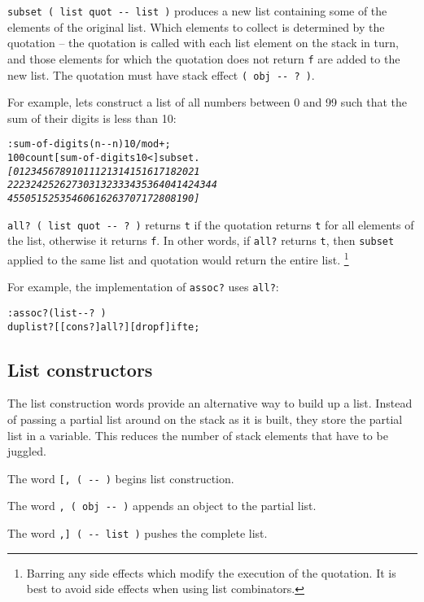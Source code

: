 \documentclass[english]{article}
\begin{document}
\texttt{subset ( list quot -{}- list )} produces a new list containing
some of the elements of the original list. Which elements to collect
is determined by the quotation -- the quotation is called with each
list element on the stack in turn, and those elements for which the
quotation does not return \texttt{f} are added to the new list. The
quotation must have stack effect \texttt{( obj -{}- ?~)}.

For example, lets construct a list of all numbers between 0 and 99
such that the sum of their digits is less than 10:

\begin{alltt}
: sum-of-digits ( n -{}- n ) 10 /mod + ;
100 count {[} sum-of-digits 10 < {]} subset .
\emph{{[} 0 1 2 3 4 5 6 7 8 9 10 11 12 13 14 15 16 17 18 20 21}
\emph{22 23 24 25 26 27 30 31 32 33 34 35 36 40 41 42 43 44}
\emph{45 50 51 52 53 54 60 61 62 63 70 71 72 80 81 90 {]} }
\end{alltt}
\texttt{all? ( list quot -{}- ?~)} returns \texttt{t} if the quotation
returns \texttt{t} for all elements of the list, otherwise it returns
\texttt{f}. In other words, if \texttt{all?} returns \texttt{t}, then
\texttt{subset} applied to the same list and quotation would return
the entire list.%
\footnote{Barring any side effects which modify the execution of the quotation.
It is best to avoid side effects when using list combinators.%
}

For example, the implementation of \texttt{assoc?} uses \texttt{all?}:

\begin{alltt}
: assoc? ( list -{}- ?~)
    dup list? {[} {[} cons? {]} all? {]} {[} drop f {]} ifte ;
\end{alltt}

\subsection{\label{sub:List-constructors}List constructors}

The list construction words provide an alternative way to build up a list. Instead of passing a partial list around on the stack as it is built, they store the partial list in a variable. This reduces the number
of stack elements that have to be juggled.

The word \texttt{{[}, ( -{}- )} begins list construction.

The word \texttt{, ( obj -{}- )} appends an object to the partial
list.

The word \texttt{,{]} ( -{}- list )} pushes the complete list.
\end{document}
